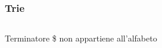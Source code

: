 \begin{frame}[fragile]
\frametitle{Trie}
\begin{columns}
\begin{column}{0.6\textwidth}
\begin{block}{Terminatore}
\$ non appartiene all'alfabeto
\end{block}
\end{column}
\begin{column}{0.4\textwidth}
\begin{center}
\end{center}
\end{column}
\end{columns}
\end{frame}

